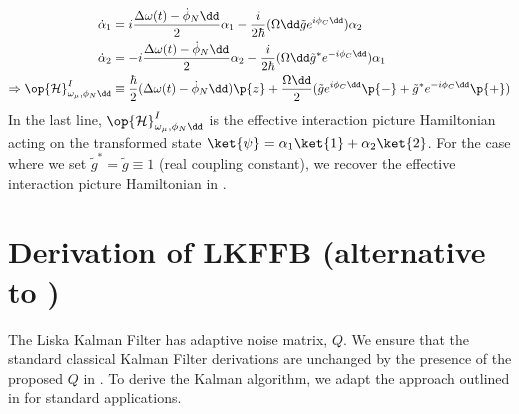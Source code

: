 \begin{align}
\dot{\alpha}_1 & =  i\frac{\Delta \omega(t) - \dot{\phi}_N \dd}{2}\alpha_1 \nonumber  %
 - \frac{i}{2\hbar}(\Omega\dd \tilde{g} e^{i\phi_C\dd}) \alpha_2  \\
\dot{\alpha}_2 & =  -i\frac{\Delta \omega(t) - \dot{\phi}_N\dd}{2}\alpha_2 \nonumber   %
- \frac{i}{2\hbar}(\Omega\dd \tilde{g}^* e^{-i\phi_C\dd})\alpha_1  \\
\Rightarrow \op{\mathcal{H}}^{I}_{\omega_\mu,\phi_N\dd} &\equiv \frac{\hbar}{2}(\Delta \omega(t)- \dot{\phi}_N\dd)\p{z} \nonumber + \frac{\Omega\dd}{2} (\tilde{g} e^{i\phi_C\dd}\p{-} + \tilde{g}^* e^{-i\phi_C\dd}\p{+}) \label{eqn:Hi}
\end{align}
In the last line, $\op{\mathcal{H}}^{I}_{\omega_\mu,\phi_N\dd}$ is the effective interaction picture Hamiltonian acting on the transformed state $\ket{\psi} = \alpha_1\ket{1} + \alpha_2\ket{2}$. For the case where we set $\tilde{g}^* = \tilde{g} \equiv 1$ (real coupling constant), we recover the effective interaction picture Hamiltonian in \cite{soare2014}.

\clearpage
\section{Derivation of LKFFB (alternative to \cite{livska2007})} \label{sec:ap_liska_deriv}
The Liska Kalman Filter has adaptive noise matrix, $Q$. We ensure that the standard classical  Kalman Filter derivations are unchanged by the presence of the proposed $Q$ in \cite{livska2007}. To derive the Kalman algorithm, we adapt the approach outlined in \cite{grewal2001theory} for standard applications. 

